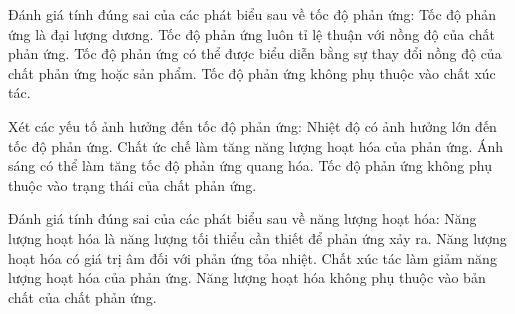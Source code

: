 \documentclass[Main.tex]{subfiles}
\begin{document}
\begin{ex}
	Đánh giá tính đúng sai của các phát biểu sau về tốc độ phản ứng:
	\choiceTF
	{\True Tốc độ phản ứng là đại lượng dương.}
	{Tốc độ phản ứng luôn tỉ lệ thuận với nồng độ của chất phản ứng.}
	{\True Tốc độ phản ứng có thể được biểu diễn bằng sự thay đổi nồng độ của chất phản ứng hoặc sản phẩm.}
	{Tốc độ phản ứng không phụ thuộc vào chất xúc tác.}
\end{ex}
\begin{ex}
	Xét các yếu tố ảnh hưởng đến tốc độ phản ứng:
	\choiceTF
	{\True Nhiệt độ có ảnh hưởng lớn đến tốc độ phản ứng.}
	{Chất ức chế làm tăng năng lượng hoạt hóa của phản ứng.}
	{\True Ánh sáng có thể làm tăng tốc độ phản ứng quang hóa.}
	{Tốc độ phản ứng không phụ thuộc vào trạng thái của chất phản ứng.}
\end{ex}
\begin{ex}
	Đánh giá tính đúng sai của các phát biểu sau về năng lượng hoạt hóa:
	\choiceTF
	{\True Năng lượng hoạt hóa là năng lượng tối thiểu cần thiết để phản ứng xảy ra.}
	{Năng lượng hoạt hóa có giá trị âm đối với phản ứng tỏa nhiệt.}
	{\True Chất xúc tác làm giảm năng lượng hoạt hóa của phản ứng.}
	{Năng lượng hoạt hóa không phụ thuộc vào bản chất của chất phản ứng.}
\end{ex}
\end{document}
